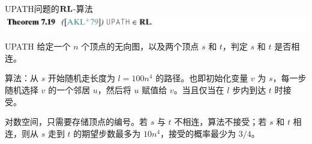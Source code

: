 \documentclass[UTF8,aspectratio=169,mathserif]{beamer}
\begin{document}
	\begin{frame}{UPATH问题的$\bf RL$-算法}
		\includegraphics[width=\linewidth]{../../7/note.assets/image-20210509163216637.png}
		
		\begin{block}{UPATH}
			给定一个 $n$ 个顶点的无向图，以及两个顶点 $s$ 和 $t$，判定 $s$ 和 $t$ 是否相连。
		\end{block}
		
		算法：从 $s$ 开始随机走长度为 $l=100n^4$ 的路径。也即初始化变量 $v$ 为 $s$，每一步随机选择 $v$ 的一个邻居 $u$，然后将 $u$ 赋值给 $v$。当且仅当在 $l$ 步内到达 $t$ 时接受。\newline
		
		对数空间，只需要存储顶点的编号。若 $s$ 与 $t$ 不相连，算法不接受；若 $s$ 和 $t$ 相连，则从 $s$ 走到 $t$ 的期望步数最多为 $10n^4$，接受的概率最少为 $3/4$。
	\end{frame}
		
\end{document}
